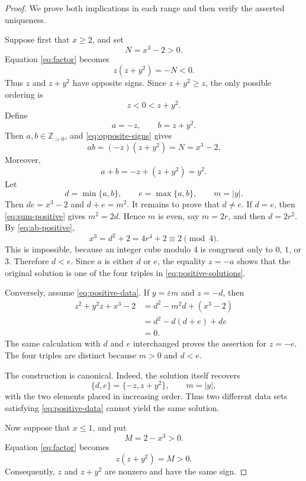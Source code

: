 \documentclass[11pt,a4paper]{amsart}
\theoremstyle{remark}
\newcommand{\Zpos}{\mathbb Z_{>0}}
\newcommand{\eps}{\varepsilon}
\begin{document}
\begin{proof}
We prove both implications in each range and then verify the asserted uniqueness.

Suppose first that $x\geq 2$, and set
\[
 N=x^3-2>0.
\]
Equation \eqref{eq:factor} becomes
\begin{equation}\label{eq:opposite-signs}
 z(z+y^2)=-N<0.
\end{equation}
Thus $z$ and $z+y^2$ have opposite signs.  Since $z+y^2\geq z$, the only possible ordering is
\begin{equation}\label{eq:ordering-positive}
 z<0<z+y^2.
\end{equation}
Define
\[
 a=-z,
 \qquad b=z+y^2.
\]
Then $a,b\in\Zpos$, and \eqref{eq:opposite-signs} gives
\begin{equation}\label{eq:ab-positive}
 ab=(-z)(z+y^2)=N=x^3-2.
\end{equation}
Moreover,
\begin{equation}\label{eq:sum-positive}
 a+b=-z+(z+y^2)=y^2.
\end{equation}
Let
\[
 d=\min\{a,b\},\qquad e=\max\{a,b\},\qquad m=|y|.
\]
Then $de=x^3-2$ and $d+e=m^2$.  It remains to prove that $d\neq e$.  If $d=e$, then \eqref{eq:sum-positive} gives $m^2=2d$.  Hence $m$ is even, say $m=2r$, and then $d=2r^2$.  By \eqref{eq:ab-positive},
\[
 x^3=d^2+2=4r^4+2\equiv 2\pmod 4.
\]
This is impossible, because an integer cube modulo $4$ is congruent only to $0$, $1$, or $3$.  Therefore $d<e$.  Since $a$ is either $d$ or $e$, the equality $z=-a$ shows that the original solution is one of the four triples in \eqref{eq:positive-solutions}.

Conversely, assume \eqref{eq:positive-data}.  If $y=\eps m$ and $z=-d$, then
\[
\begin{aligned}
 z^2+y^2z+x^3-2
 &=d^2-m^2d+(x^3-2)\\
 &=d^2-d(d+e)+de\\
 &=0.
\end{aligned}
\]
The same calculation with $d$ and $e$ interchanged proves the assertion for $z=-e$.  The four triples are distinct because $m>0$ and $d<e$.

The construction is canonical.  Indeed, the solution itself recovers
\[
 \{d,e\}=\{-z,z+y^2\},
 \qquad m=|y|,
\]
with the two elements placed in increasing order.  Thus two different data sets satisfying \eqref{eq:positive-data} cannot yield the same solution.

Now suppose that $x\leq 1$, and put
\[
 M=2-x^3>0.
\]
Equation \eqref{eq:factor} becomes
\begin{equation}\label{eq:same-signs}
 z(z+y^2)=M>0.
\end{equation}
Consequently, $z$ and $z+y^2$ are nonzero and have the same sign.


\end{proof}
\end{document}
